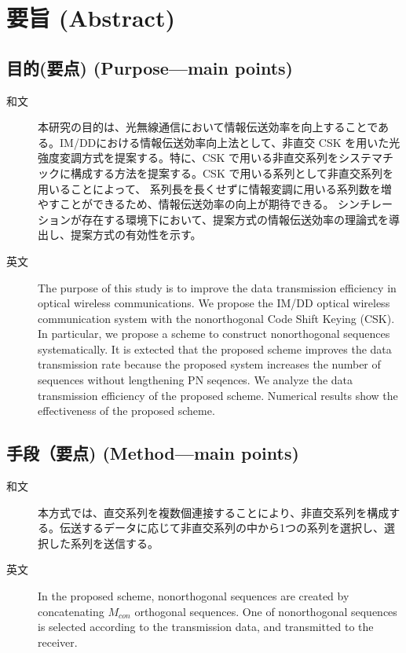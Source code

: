 ﻿\documentclass[a4j,10pt]{jarticle}
\begin{document}
\section{要旨 (Abstract)}
\subsection{目的(要点) (Purpose---main points)}\label{purpose}
\begin{description}
 \item[和文] 本研究の目的は、光無線通信において情報伝送効率を向上することである。IM/DDにおける情報伝送効率向上法として、非直交 CSK を用いた光強度変調方式を提案する。特に、CSK で用いる非直交系列をシステマチックに構成する方法を提案する。CSK で用いる系列として非直交系列を用いることによって、
系列長を長くせずに情報変調に用いる系列数を増やすことができるため、情報伝送効率の向上が期待できる。
シンチレーションが存在する環境下において、提案方式の情報伝送効率の理論式を導出し、提案方式の有効性を示す。
 \item[英文] The purpose of this study is to improve the data transmission efficiency in optical wireless communications. We propose the IM/DD optical wireless communication system with the nonorthogonal Code Shift Keying (CSK). In particular, we propose a scheme to construct nonorthogonal sequences systematically. It is extected that the proposed scheme improves the data transmission rate because the proposed system increases the number of sequences without lengthening PN seqences. We analyze the data transmission efficiency of the proposed scheme. Numerical results show the effectiveness of the proposed scheme. 
\end{description}
%
\subsection{手段（要点) (Method---main points)}\label{method}
\begin{description}
 \item[和文] 本方式では、直交系列を複数個連接することにより、非直交系列を構成する。伝送するデータに応じて非直交系列の中から1つの系列を選択し、選択した系列を送信する。
%
 \item[英文] In the proposed scheme, nonorthogonal sequences are created by concatenating $M_{con}$ orthogonal sequences. One of nonorthogonal sequences is selected according to the transmission data, and transmitted to the receiver. 
\end{description}
%
\end{document}

